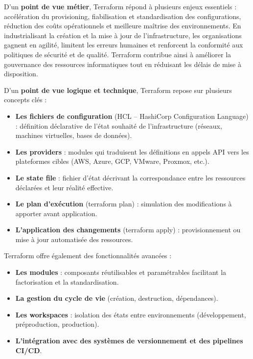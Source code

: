 D’un \textbf{point de vue métier}, Terraform répond à plusieurs enjeux essentiels  : accélération du provisioning, fiabilisation et standardisation des configurations, réduction des coûts opérationnels et meilleure maîtrise des environnements. En industrialisant la création et la mise à jour de l’infrastructure, les organisations gagnent en agilité, limitent les erreurs humaines et renforcent la conformité aux politiques de sécurité et de qualité. Terraform contribue ainsi à améliorer la gouvernance des ressources informatiques tout en réduisant les délais de mise à disposition.

D’un \textbf{point de vue logique et technique}, Terraform repose sur plusieurs concepts clés :
\begin{itemize}
	\item \textbf{Les fichiers de configuration} (HCL – HashiCorp Configuration Language)  : définition déclarative de l’état souhaité de l’infrastructure (réseaux, machines virtuelles, bases de données).
	\item \textbf{Les providers}  : modules qui traduisent les définitions en appels API vers les plateformes cibles (AWS, Azure, GCP, VMware, Proxmox, etc.).
	\item \textbf{Le state file}  : fichier d’état décrivant la correspondance entre les ressources déclarées et leur réalité effective.
	\item \textbf{Le plan d’exécution} (terraform plan)  : simulation des modifications à apporter avant application.
	\item \textbf{L’application des changements} (terraform apply)  : provisionnement ou mise à jour automatisée des ressources.
\end{itemize}

Terraform offre également des fonctionnalités avancées  :
\begin{itemize}
	\item \textbf{Les modules}  : composants réutilisables et paramétrables facilitant la factorisation et la standardisation.
	\item \textbf{La gestion du cycle de vie} (création, destruction, dépendances).
	\item \textbf{Les workspaces}  : isolation des états entre environnements (développement, préproduction, production).
	\item \textbf{L’intégration avec des systèmes de versionnement et des pipelines CI/CD}.
\end{itemize}

